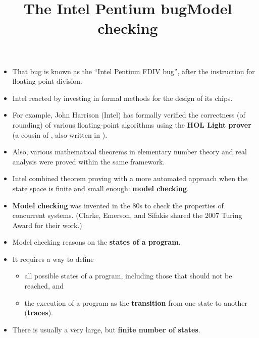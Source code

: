 \documentclass[wide]{slides}
\begin{document}
\begin{slide}
  \title{The Intel Pentium bug}

  \begin{itemize}

    \item That bug is known as the ``Intel Pentium FDIV bug'', after
      the instruction for floating-point division.

    \item Intel reacted by investing in formal methods for the design
      of its chips.

    \item For example, John Harrison (Intel) has formally verified the
      correctness (of rounding) of various floating\hyp{}point
      algorithms using the \textbf{HOL Light prover} (a cousin of
      \Coq, also written in \OCaml).

    \item Also, various mathematical theorems in elementary number
      theory and real analysis were proved within the same framework.

    \item Intel combined theorem proving with a more automated
      approach when the state space is finite and small enough:
      \textbf{model checking}.

  \end{itemize}

\end{slide}

\begin{slide}
  \title{Model checking}

  \begin{itemize}

     \item \textbf{Model checking} was invented in the 80s to check
       the properties of concurrent systems.  (Clarke, Emerson, and
       Sifakis shared the 2007 Turing Award for their work.)

     \item Model checking reasons on the \textbf{states of a program}.

     \item It requires a way to define
       \begin{itemize}

         \item all possible states of a program, including those that
           should not be reached, and

         \item the execution of a program as the \textbf{transition}
           from one state to another (\textbf{traces}).

       \end{itemize}

     \item There is usually a very large, but \textbf{finite number of
       states}.

  \end{itemize}

\end{slide}
\end{document}
